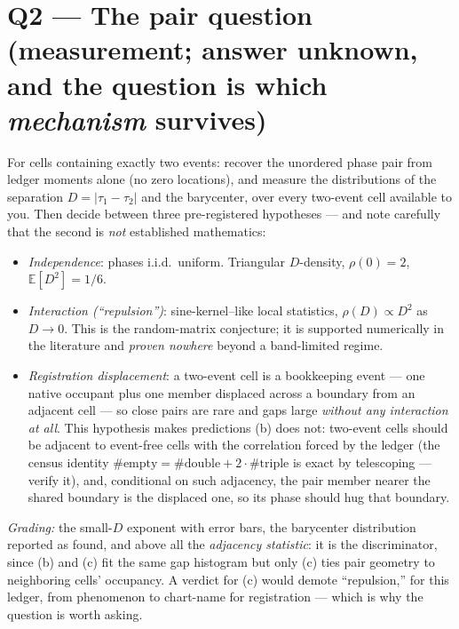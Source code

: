 \documentclass[11pt]{article}
\begin{document}
\section*{Q2 --- The pair question (measurement; answer unknown, and the
question is which \emph{mechanism} survives)}
For cells containing exactly two events: recover the unordered phase pair from
ledger moments alone (no zero locations), and measure the distributions of the
separation $D=|\tau_1-\tau_2|$ and the barycenter, over every two-event cell
available to you.  Then decide between three pre-registered hypotheses ---
and note carefully that the second is \emph{not} established mathematics:
\begin{itemize}
\item[(a)] \emph{Independence}: phases i.i.d.\ uniform.  Triangular $D$-density,
$\rho(0)=2$, $\mathbb E[D^2]=1/6$.
\item[(b)] \emph{Interaction (``repulsion'')}: sine-kernel--like local
statistics, $\rho(D)\propto D^2$ as $D\to0$.  This is the random-matrix
conjecture; it is supported numerically in the literature and \emph{proven
nowhere} beyond a band-limited regime.
\item[(c)] \emph{Registration displacement}: a two-event cell is a bookkeeping
event --- one native occupant plus one member displaced across a boundary from
an adjacent cell --- so close pairs are rare and gaps large \emph{without any
interaction at all}.  This hypothesis makes predictions (b) does not:
two-event cells should be adjacent to event-free cells with the correlation
forced by the ledger (the census identity $\#\text{empty}=\#\text{double}
+2\cdot\#\text{triple}$ is exact by telescoping --- verify it), and,
conditional on such adjacency, the pair member nearer the shared boundary is
the displaced one, so its phase should hug that boundary.
\end{itemize}
\emph{Grading:} the small-$D$ exponent with error bars, the barycenter
distribution reported as found, and above all the \emph{adjacency statistic}:
it is the discriminator, since (b) and (c) fit the same gap histogram but only
(c) ties pair geometry to neighboring cells' occupancy.  A verdict for (c)
would demote ``repulsion,'' for this ledger, from phenomenon to chart-name for
registration --- which is why the question is worth asking.
\end{document}
